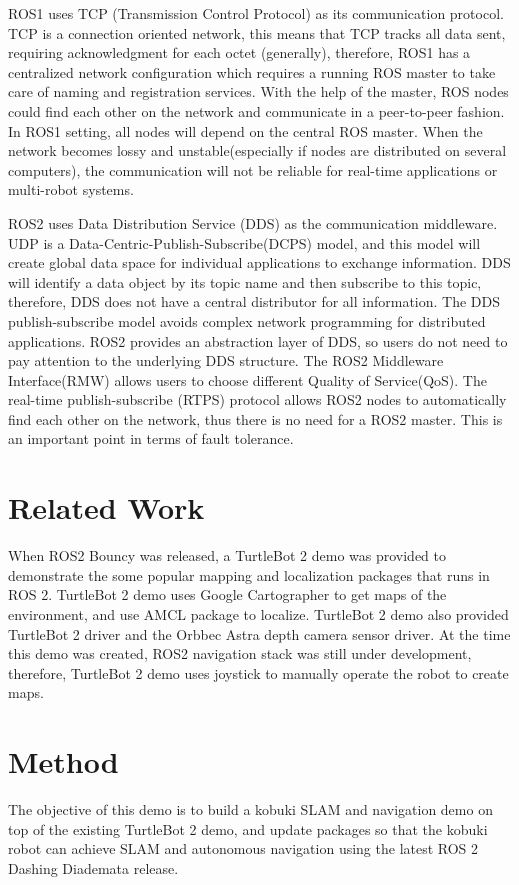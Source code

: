 \documentclass[letterpaper, 10 pt, conference]{ieeeconf}  %
\begin{document}
ROS1 uses TCP (Transmission Control Protocol) as its communication protocol. TCP is a connection oriented network, this means that TCP tracks all data sent, requiring acknowledgment for each octet (generally), therefore,  ROS1 has a centralized network configuration which requires a running ROS master to take care of naming and registration services. With the help of the master, ROS nodes could find each other on the network and communicate in a peer-to-peer fashion. In ROS1 setting, all nodes will depend on the central ROS master. When the network becomes lossy and unstable(especially if nodes are distributed on several computers), the communication will not be reliable for real-time applications or multi-robot systems.

ROS2 uses Data Distribution Service (DDS) as the communication middleware. UDP is a Data-Centric-Publish-Subscribe(DCPS) model, and this model will create global data space for individual applications to exchange information. DDS will identify a data object by its topic name and then subscribe to this topic, therefore, DDS does not have a central distributor for all information. The DDS publish-subscribe model avoids complex network programming for distributed applications.  ROS2 provides an abstraction layer of DDS, so users do not need to pay attention to the underlying DDS structure. The ROS2 Middleware Interface(RMW) allows users to choose different Quality of Service(QoS). The real-time publish-subscribe (RTPS) protocol allows ROS2 nodes to automatically find each other on the network, thus there is no need for a ROS2 master. This is an important point in terms of fault tolerance.
\section{Related Work}
When ROS2 Bouncy was released, a TurtleBot 2 demo was provided to demonstrate the some popular mapping and localization packages that runs in ROS 2. TurtleBot 2 demo uses Google Cartographer to get maps of the environment, and use AMCL package to localize. TurtleBot 2 demo also provided TurtleBot 2 driver and the Orbbec Astra depth camera sensor driver. At the time this demo was created, ROS2 navigation stack was still under development, therefore, TurtleBot 2 demo uses joystick to manually operate the robot to create maps. 
\section{Method}
The objective of this demo is to build a kobuki SLAM and navigation demo on top of the existing TurtleBot 2 demo, and update packages so that the kobuki robot can achieve SLAM and autonomous navigation using the latest ROS 2 Dashing Diademata release. 
 
\end{document}

